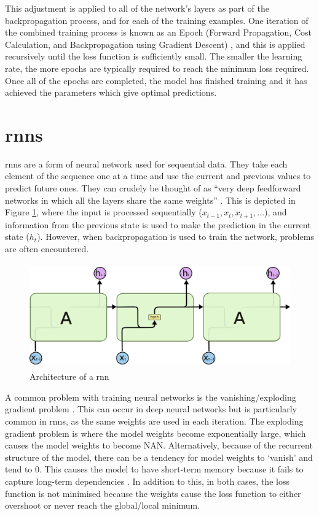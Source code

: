 This adjustment is applied to all of the network's layers as part of the backpropagation process, and for each of the training examples. One iteration of the combined training process is known as an Epoch (Forward Propagation, Cost Calculation, and Backpropagation using Gradient Descent) \citep{Sharma}, and this is applied recursively until the loss function is sufficiently small. The smaller the learning rate, the more epochs are typically required to reach the minimum loss required. Once all of the epochs are completed, the model has finished training and it has achieved the parameters which give optimal predictions.

\section{\acrlong{rnn}s}
\label{sec:background_rnns}
\acrlong{rnn}s are a form of neural network used for sequential data. They take each element of the sequence one at a time and use the current and previous values to predict future ones. They can crudely be thought of as ``very deep feedforward networks in which all the layers share the same weights'' \citep{Yann}. This is depicted in Figure \ref{fig:rnn_architecture}, where the input is processed sequentially ($x_{t-1}, x_{t}, x_{t+1},\ldots$), and information from the previous state is used to make the prediction in the current state ($h_{t}$). However, when backpropagation is used to train the network, problems are often encountered.

\begin{figure}[h]
    \centering
    \includegraphics[height=4.5cm,trim={0 0 0cm 0cm},clip]{Paper/images/rnn.png}
    \caption{Architecture of a \acrlong{rnn} \citep{olah2015understanding}}
    \label{fig:rnn_architecture}
\end{figure}

A common problem with training neural networks is the vanishing/exploding gradient problem \citep{hochreiter1997long}. This can occur in deep neural networks but is particularly common in \acrshort{rnn}s, as the same weights are used in each iteration. The exploding gradient problem is where the model weights become exponentially large, which causes the model weights to become NAN. Alternatively, because of the recurrent structure of the model, there can be a tendency for model weights to `vanish' and tend to 0. This causes the model to have short-term memory because it fails to capture long-term dependencies \citep{chung2014empirical}. In addition to this, in both cases, the loss function is not minimised because the weights cause the loss function to either overshoot or never reach the global/local minimum.

